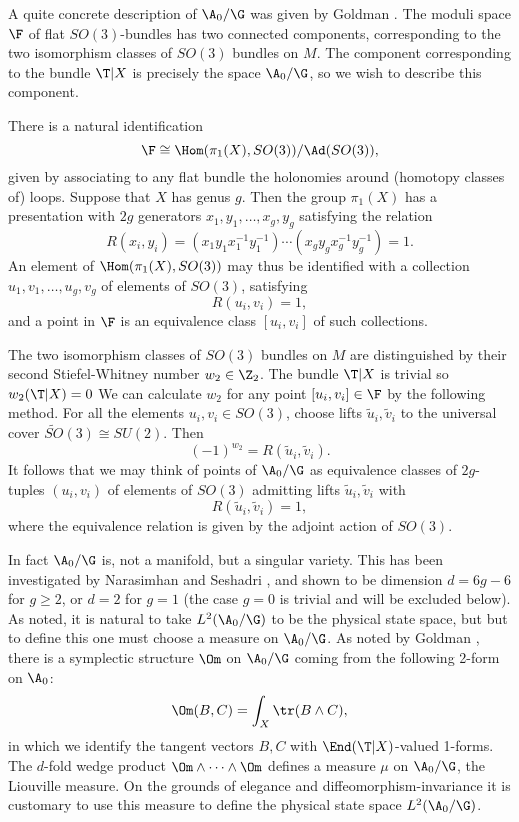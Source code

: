 A quite concrete description of $\A_0/\G$ was given by Goldman
\cite{Goldman}.  The moduli space $\F$ of flat $SO(3)$-bundles
has two connected components,
corresponding to the two isomorphism classes of $SO(3)$ bundles on
$M$.  The component corresponding to the bundle $\T|X$ is precisely the space
$\A_0/\G$, so we wish to describe this component.

There is a natural identification
\[        \F \cong  \Hom(\pi_1(X),SO(3))/\Ad(SO(3)), \]
given by associating to any flat bundle the holonomies around
(homotopy classes of) loops.  Suppose that $X$ has
genus $g$.  Then the group $\pi_1(X)$ has a
presentation with $2g$ generators $x_1,y_1, \dots, x_g,y_g$ satisfying
the relation
\[    R(x_i,y_i) = (x_1y_1x_1^{-1}y_1^{-1}) \cdots
(x_gy_gx_g^{-1}y_g^{-1}) = 1 .\]
An element of $\Hom(\pi_1(X), SO(3))$ may thus be identified with
a collection \break
$u_1,v_1, \dots, u_g,v_g$ of elements of $SO(3)$, satisfying
\[    R(u_i,v_i) = 1 ,\]
and a point in $\F$ is an equivalence class $[u_i, v_i]$ of such collections.

The two isomorphism classes of $SO(3)$ bundles on $M$ are
distinguished by their second Stiefel-Whitney number $w_2 \in \Z_2$.
The bundle $\T|X$ is trivial so $w_2(\T|X) = 0$
We can calculate $w_2$ for any point $[u_i, v_i] \in \F$ by the
following method.  For all the elements $u_i, v_i \in SO(3)$, choose lifts
$\tilde u_i, \tilde v_i$ to the universal cover $\widetilde{SO}(3) \cong
SU(2)$.  Then
\[     (-1)^{w_2} = R(\tilde u_i ,\tilde v_i) .\]
It follows that we may think of points of $\A_0/\G$
as equivalence classes of $2g$-tuples
$(u_i,v_i)$ of elements of $SO(3)$ admitting lifts $\tilde u_i, \tilde
v_i$ with
\[     R(\tilde u_i, \tilde v_i) = 1,\]
where the equivalence relation is given by the adjoint action of $SO(3)$.

In fact $\A_0/\G$ is, not a manifold, but a singular variety.
This has been investigated by Narasimhan and Seshadri \cite{NS}, and
shown to be
dimension $d = 6g - 6$ for $g \ge 2$, or $d = 2$ for $g = 1$ (the case
$g = 0$ is trivial and will be excluded below).
As noted,
it is natural to take $L^2(\A_0/\G)$ to be the physical state space, but
but to define this one must choose a measure on $\A_0/\G$.
As noted by Goldman \cite{Goldman}, there is a symplectic structure
$\Om$ on $\A_0/\G$ coming from the following 2-form on $\A_0$:
\[         \Om(B,C) = \int_X \tr(B \wedge C),  \]
in which we identify the tangent vectors $B,C$ with $\End(\T|X)$-valued
1-forms.   The $d$-fold wedge product $\Om \wedge \cdots \wedge \Om$
defines a measure $\mu$ on $\A_0/\G$, the Liouville measure.
On the grounds of elegance and diffeomorphism-invariance
it is customary to use this
measure to define the physical state space $L^2(\A_0/\G)$.

